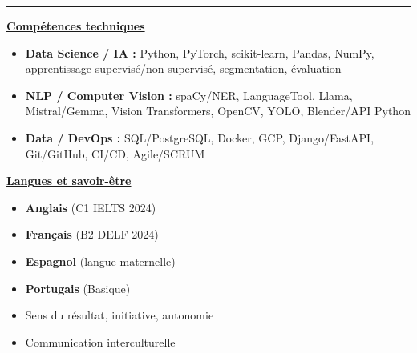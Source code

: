 \documentclass[letterpaper,10pt]{article}
\begin{document}
\begin{tabularx}{\textwidth}{>{\raggedright\arraybackslash}X >{\raggedleft\arraybackslash}p{}}
  \end{tabularx}



  

\vspace{5pt}
\noindent\rule{\textwidth}{0.4pt}
\vspace{2pt}

\noindent
\begin{minipage}[t]{0.64\textwidth}
  \raggedright
  \textbf{\underline{Compétences techniques}}\\[-2pt]
  {\scriptsize
    \begin{itemize}[leftmargin=*,itemsep=1pt,parsep=0pt,topsep=0pt,partopsep=0pt]
      \item \textbf{Data Science / IA :} Python, PyTorch, scikit-learn, Pandas, NumPy, apprentissage supervisé/non supervisé, segmentation, évaluation
      \item \textbf{NLP / Computer Vision :} spaCy/NER, LanguageTool, Llama, Mistral/Gemma, Vision Transformers, OpenCV, YOLO, Blender/API Python
      \item \textbf{Data / DevOps :} SQL/PostgreSQL, Docker, GCP, Django/FastAPI, Git/GitHub, CI/CD, Agile/SCRUM
    \end{itemize}
  }
\end{minipage}\hfill
\begin{minipage}[t]{0.33\textwidth}
  \raggedright
  \textbf{\underline{Langues et savoir-être}}\\[-2pt]
  {\scriptsize
    \begin{itemize}[leftmargin=*,itemsep=0pt,parsep=0pt,topsep=0pt,partopsep=0pt]
      \item \textbf{Anglais} (C1 \textendash{} IELTS 2024)
      \item \textbf{Français} (B2 \textendash{} DELF 2024)
      \item \textbf{Espagnol} (langue maternelle)
      \item \textbf{Portugais} (Basique)
      \item Sens du résultat, initiative, autonomie
      \item Communication interculturelle
    \end{itemize}
  }
\end{minipage}\hfill



\end{document}
